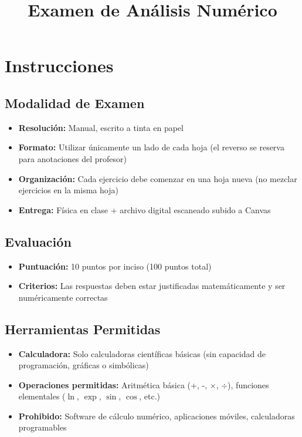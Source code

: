 \documentclass[12pt,a4paper]{article}
\title{\textbf{Examen de Análisis Numérico}}
\author{}
\date{}
\begin{document}
\maketitle

\section*{Instrucciones}

\subsection*{Modalidad de Examen}
\begin{itemize}
\item \textbf{Resolución:} Manual, escrito a tinta en papel
\item \textbf{Formato:} Utilizar únicamente un lado de cada hoja (el reverso se reserva para anotaciones del profesor)
\item \textbf{Organización:} Cada ejercicio debe comenzar en una hoja nueva (no mezclar ejercicios en la misma hoja)
\item \textbf{Entrega:} Física en clase + archivo digital escaneado subido a Canvas
\end{itemize}

\subsection*{Evaluación}
\begin{itemize}
\item \textbf{Puntuación:} 10 puntos por inciso (100 puntos total)
\item \textbf{Criterios:} Las respuestas deben estar justificadas matemáticamente y ser numéricamente correctas
\end{itemize}

\subsection*{Herramientas Permitidas}
\begin{itemize}
\item \textbf{Calculadora:} Solo calculadoras científicas básicas (sin capacidad de programación, gráficas o simbólicas)
\item \textbf{Operaciones permitidas:} Aritmética básica (+, -, $\times$, $\div$), funciones elementales ($\ln$, $\exp$, $\sin$, $\cos$, etc.)
\item \textbf{Prohibido:} Software de cálculo numérico, aplicaciones móviles, calculadoras programables
\end{itemize}
\end{document}
